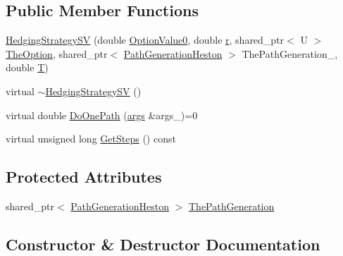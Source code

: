 \subsection*{Public Member Functions}
\begin{DoxyCompactItemize}
\item 
\hyperlink{classHedgingStrategySV_a84ab774ac65cd01cbac84230f7b42eb9}{Hedging\+Strategy\+SV} (double \hyperlink{classHedgingStrategy_ac96528e9f4e5a0d1e5aadcc2ebdcab55}{Option\+Value0}, double \hyperlink{classHedgingStrategy_a313da7bc1911dba2a166d2c7bed5f1d7}{r}, shared\+\_\+ptr$<$ U $>$ \hyperlink{classHedgingStrategy_a65699a183423af9d947bb939ae8e907d}{The\+Option}, shared\+\_\+ptr$<$ \hyperlink{classPathGenerationHeston}{Path\+Generation\+Heston} $>$ The\+Path\+Generation\+\_\+, double \hyperlink{classHedgingStrategy_aedb4069f0709b49482a72b9d9c906a5e}{T})
\item 
virtual \hyperlink{classHedgingStrategySV_ae9105e2ff747d92d970fda66de06d8d0}{$\sim$\+Hedging\+Strategy\+SV} ()
\item 
virtual double \hyperlink{classHedgingStrategySV_abb9531c069f4d1e758fc23c4bc7ed09c}{Do\+One\+Path} (\hyperlink{path__generation_8h_a75c13cde2074f502cc4348c70528572d}{args} \&args\+\_\+)=0
\item 
virtual unsigned long \hyperlink{classHedgingStrategySV_a8cdbb26bfa8da99f16161f2449928a5e}{Get\+Steps} () const
\end{DoxyCompactItemize}
\subsection*{Protected Attributes}
\begin{DoxyCompactItemize}
\item 
shared\+\_\+ptr$<$ \hyperlink{classPathGenerationHeston}{Path\+Generation\+Heston} $>$ \hyperlink{classHedgingStrategySV_aa341650c5b2846606e59e3e6c6225aca}{The\+Path\+Generation}
\end{DoxyCompactItemize}


\subsection{Constructor \& Destructor Documentation}
\hypertarget{classHedgingStrategySV_a84ab774ac65cd01cbac84230f7b42eb9}{}\label{classHedgingStrategySV_a84ab774ac65cd01cbac84230f7b42eb9} 
